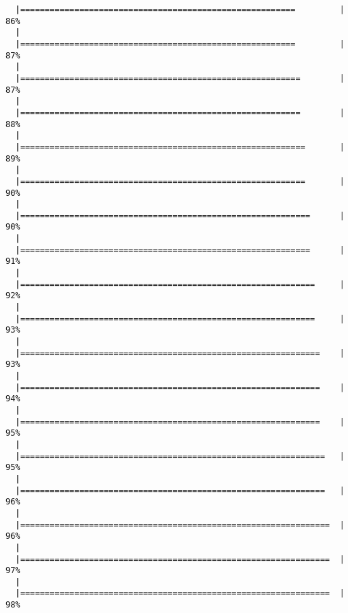 \begin{knitrout}
\begin{kframe}
\begin{verbatim}
  |========================================================         |  86%
  |                                                                       
  |========================================================         |  87%
  |                                                                       
  |=========================================================        |  87%
  |                                                                       
  |=========================================================        |  88%
  |                                                                       
  |==========================================================       |  89%
  |                                                                       
  |==========================================================       |  90%
  |                                                                       
  |===========================================================      |  90%
  |                                                                       
  |===========================================================      |  91%
  |                                                                       
  |============================================================     |  92%
  |                                                                       
  |============================================================     |  93%
  |                                                                       
  |=============================================================    |  93%
  |                                                                       
  |=============================================================    |  94%
  |                                                                       
  |=============================================================    |  95%
  |                                                                       
  |==============================================================   |  95%
  |                                                                       
  |==============================================================   |  96%
  |                                                                       
  |===============================================================  |  96%
  |                                                                       
  |===============================================================  |  97%
  |                                                                       
  |===============================================================  |  98%

\end{verbatim}
\end{kframe}
\end{knitrout}
